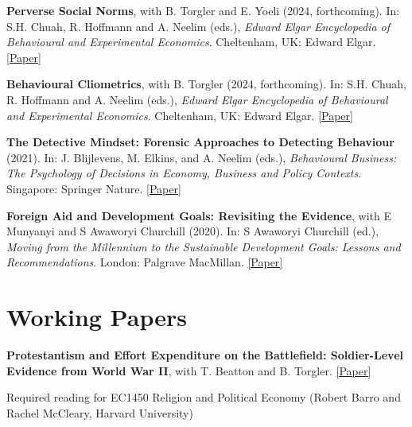 \documentclass[letterpaper]{article}
\renewenvironment{itemize}{
  \begin{list}{}{
    \setlength{\leftmargin}{1.5em}
  }
}{
  \end{list}
}
\begin{document}
\begin{itemize}

	\item {\bf Perverse Social Norms}, with B. Torgler and E. Yoeli (2024, forthcoming). In: S.H. Chuah, R. Hoffmann and A. Neelim (eds.), \textit{Edward Elgar Encyclopedia of Behavioural and Experimental Economics}. Cheltenham, UK: Edward Elgar. \href{https://drive.google.com/file/d/132rMWFxxwCWb974hB2EOs1SABoPdYFEX/view}{[Paper]}
		
	\medskip

	\item {\bf Behavioural Cliometrics}, with B. Torgler (2024, forthcoming). In: S.H. Chuah, R. Hoffmann and A. Neelim (eds.), \textit{Edward Elgar Encyclopedia of Behavioural and Experimental Economics}. Cheltenham, UK: Edward Elgar. \href{https://drive.google.com/file/d/132rMWFxxwCWb974hB2EOs1SABoPdYFEX/view}{[Paper]}
	
	\medskip

	\item {\bf The Detective Mindset: Forensic Approaches to Detecting Behaviour} (2021). In: J. Blijlevens, M. Elkins, and A. Neelim (eds.), \textit{Behavioural Business: The Psychology of Decisions in Economy, Business and Policy Contexts}. Singapore: Springer Nature. \href{https://drive.google.com/file/d/132rMWFxxwCWb974hB2EOs1SABoPdYFEX/view}{[Paper]}
	
	\medskip
	
	\item {\bf Foreign Aid and Development Goals: Revisiting the Evidence}, with E Munyanyi and S Awaworyi Churchill (2020). In: S Awaworyi Churchill (ed.), \textit{Moving from the Millennium to the Sustainable Development Goals: Lessons and Recommendations}. London: Palgrave MacMillan. \href{https://link.springer.com/chapter/10.1007\%2F978-981-15-1556-9_9}{[Paper]}
	



\end{itemize}


\section*{Working Papers}



\begin{itemize}

	\item \textbf{Protestantism and Effort Expenditure on the Battlefield: Soldier-Level Evidence from World War II}, with T. Beatton and B. Torgler. \href{https://drive.google.com/open?id=1J8YwNjWMgF96_hyx6sx1B5_LyjH9ll0R}{[Paper]}
	
	\begin{itemize}
		\item 	Required reading for EC1450 Religion and Political Economy (Robert Barro and Rachel McCleary, Harvard University)
		\end{itemize}
	
\end{itemize}
\end{document}
